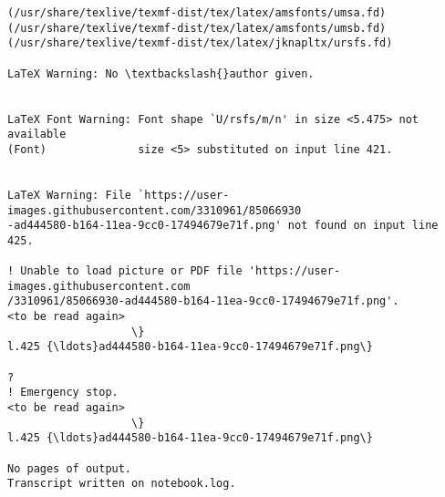 \documentclass[11pt]{article}
\begin{document}
\begin{Verbatim}[commandchars=\\\{\}]
(/usr/share/texlive/texmf-dist/tex/latex/amsfonts/umsa.fd)
(/usr/share/texlive/texmf-dist/tex/latex/amsfonts/umsb.fd)
(/usr/share/texlive/texmf-dist/tex/latex/jknapltx/ursfs.fd)

LaTeX Warning: No \textbackslash{}author given.


LaTeX Font Warning: Font shape `U/rsfs/m/n' in size <5.475> not available
(Font)              size <5> substituted on input line 421.


LaTeX Warning: File `https://user-images.githubusercontent.com/3310961/85066930
-ad444580-b164-11ea-9cc0-17494679e71f.png' not found on input line 425.

! Unable to load picture or PDF file 'https://user-images.githubusercontent.com
/3310961/85066930-ad444580-b164-11ea-9cc0-17494679e71f.png'.
<to be read again>
                   \}
l.425 {\ldots}ad444580-b164-11ea-9cc0-17494679e71f.png\}

?
! Emergency stop.
<to be read again>
                   \}
l.425 {\ldots}ad444580-b164-11ea-9cc0-17494679e71f.png\}

No pages of output.
Transcript written on notebook.log.

    \end{Verbatim}


    
    
    
\end{document}
